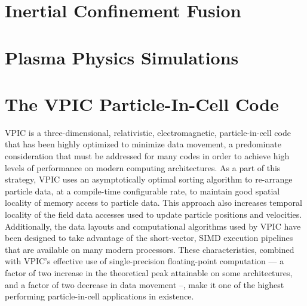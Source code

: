 \documentclass[letter,10pt]{article}
\begin{document}
\section*{Inertial Confinement Fusion}

\section*{Plasma Physics Simulations}

\section*{The VPIC Particle-In-Cell Code}

VPIC is a three-dimensional, relativistic, electromagnetic, particle-in-cell code that has been highly optimized to minimize data movement, a predominate consideration that must be addressed for many codes in order to achieve high levels of performance on modern computing architectures.  As a part of this strategy, VPIC uses an asymptotically optimal sorting algorithm to re-arrange particle data, at a compile-time configurable rate, to maintain good spatial locality of memory access to particle data.  This approach also increases temporal locality of the field data accesses used to update particle positions and velocities.  Additionally, the data layouts and computational algorithms used by VPIC have been designed to take advantage of the short-vector, SIMD execution pipelines that are available on many modern processors.  These characteristics, combined with VPIC's effective use of single-precision floating-point computation --- a factor of two increase in the theoretical peak attainable on some architectures, and a factor of two decrease in data movement --, make it one of the highest performing particle-in-cell applications in existence.

\end{document}
